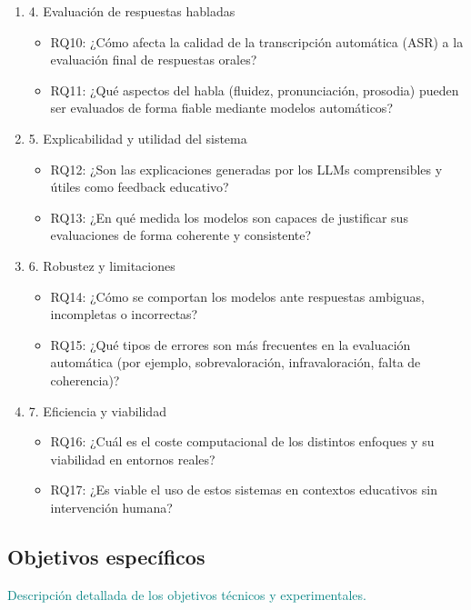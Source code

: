 {\begin{enumerate}
\begin{itemize}
    \end{itemize}
    \item 4. Evaluación de respuestas habladas
    \begin{itemize}
        \item RQ10: ¿Cómo afecta la calidad de la transcripción automática (ASR) a la evaluación final de respuestas orales?
        \item RQ11: ¿Qué aspectos del habla (fluidez, pronunciación, prosodia) pueden ser evaluados de forma fiable mediante modelos automáticos?
    \end{itemize}
    \item 5. Explicabilidad y utilidad del sistema
    \begin{itemize}
        \item RQ12: ¿Son las explicaciones generadas por los LLMs comprensibles y útiles como feedback educativo?
        \item RQ13: ¿En qué medida los modelos son capaces de justificar sus evaluaciones de forma coherente y consistente?
    \end{itemize}
    \item 6. Robustez y limitaciones
    \begin{itemize}
        \item RQ14: ¿Cómo se comportan los modelos ante respuestas ambiguas, incompletas o incorrectas?
        \item RQ15: ¿Qué tipos de errores son más frecuentes en la evaluación automática (por ejemplo, sobrevaloración, infravaloración, falta de coherencia)?
    \end{itemize}
    \item 7. Eficiencia y viabilidad
    \begin{itemize}
        \item RQ16: ¿Cuál es el coste computacional de los distintos enfoques y su viabilidad en entornos reales?
        \item RQ17: ¿Es viable el uso de estos sistemas en contextos educativos sin intervención humana?
    \end{itemize}
\end{enumerate}
}

\subsection{Objetivos específicos}
\textcolor{teal}{Descripción detallada de los objetivos técnicos y experimentales.}
